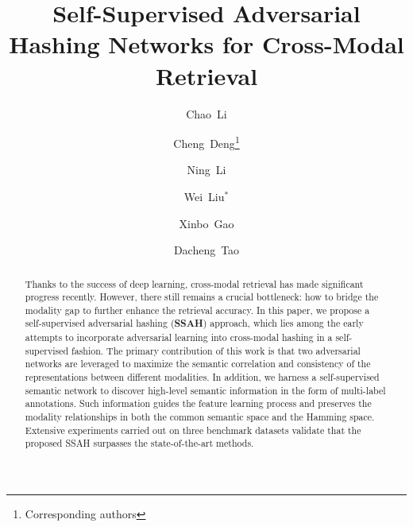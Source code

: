 \documentclass[10pt,twocolumn,letterpaper]{article}
\begin{document}
\title{Self-Supervised Adversarial Hashing Networks for Cross-Modal Retrieval}
\author[1]{Chao~Li}
\author[1]{Cheng~Deng\thanks{Corresponding authors}}
\author[1]{Ning~Li}
\author[2]{Wei~Liu$^{*}$}
\author[1]{Xinbo~Gao}
\author[3]{Dacheng~Tao}
\maketitle
\thispagestyle{empty}
\begin{abstract}
Thanks to the success of deep learning, cross-modal retrieval has made significant progress recently. However, there still remains a crucial bottleneck: how to bridge the modality gap to further enhance the retrieval accuracy. In this paper, we propose a self-supervised adversarial hashing (\textbf{SSAH}) approach, which lies among the early attempts to incorporate adversarial learning into cross-modal hashing in a self-supervised fashion. The primary contribution of this work is that two adversarial networks are leveraged to maximize the semantic correlation and consistency of the representations between different modalities. In addition, we harness a self-supervised semantic network to discover high-level semantic information in the form of multi-label annotations. Such information guides the feature learning process and preserves the modality relationships in both the common semantic space and the Hamming space. Extensive experiments carried out on three benchmark datasets validate that the proposed SSAH surpasses the state-of-the-art methods.
\vspace{-0.5cm}
\end{abstract}
\end{document}
